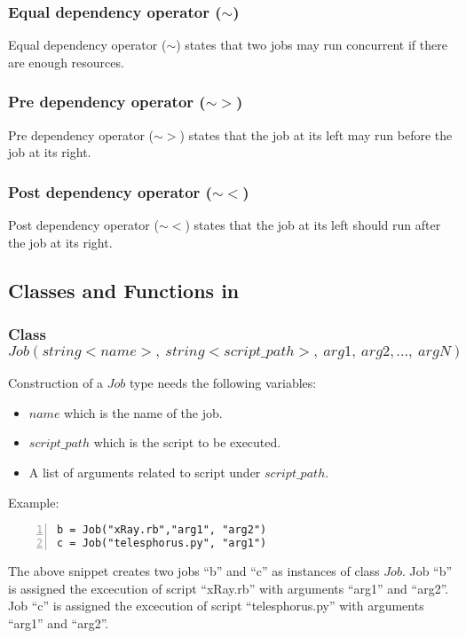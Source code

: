 \subsubsection*{Equal dependency operator ($\sim$)}
Equal dependency operator ($\sim$) states that two jobs may run concurrent if there
are enough resources.
\subsubsection*{Pre dependency operator ($\sim>$)}
Pre dependency operator ($\sim>$) states that the job at its left may run before the job
at its right.
\subsubsection*{Post dependency operator ($\sim<$)}
Post dependency operator ($\sim<$) states that the job at its left should run after the job
at its right.

\subsection*{Classes and Functions in \lang{}}
\subsubsection*{Class $Job(string <name>,~ string <script\_path>,~arg1,~arg2, ...,~argN)$}
Construction of a $Job$ type needs the following variables:
\begin{itemize}
\item $name$ which is the name of the job.
\item $script\_path$ which is the script to be executed.
\item A list of arguments related to script under $script\_path$.\\
\end{itemize}
Example:
\begin{Verbatim}[numbers=left]
b = Job("xRay.rb","arg1", "arg2")
c = Job("telesphorus.py", "arg1")
\end{Verbatim}

The above snippet creates two jobs ``b'' and ``c'' as instances of class $Job$.
Job ``b'' is assigned the excecution of script ``xRay.rb'' with arguments ``arg1'' and ``arg2''.
Job ``c'' is assigned the excecution of script ``telesphorus.py'' with arguments ``arg1'' and ``arg2''.



